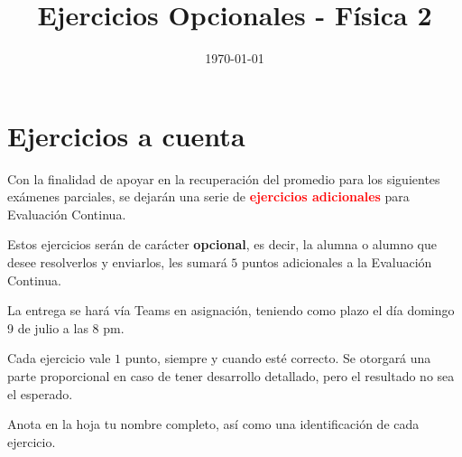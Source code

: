 \documentclass[14pt]{extarticle}
\title{\vspace*{-2cm} Ejercicios Opcionales - Física 2\vspace{-5ex}}
\date{\today}
\newcommand{\textocolor}[2]{\textbf{\textcolor{#1}{#2}}}
\begin{document}
\maketitle

\section{Ejercicios a cuenta}

Con la finalidad de apoyar en la recuperación del promedio para los siguientes exámenes parciales, se dejarán una serie de \textocolor{red}{ejercicios adicionales} para Evaluación Continua.


Estos ejercicios serán de carácter \textocolor{cobalt}{opcional}, es decir, la alumna o alumno que desee resolverlos y enviarlos, les sumará $5$ puntos adicionales a la Evaluación Continua.

La entrega se hará vía Teams en asignación, teniendo como plazo el día domingo 9 de julio a las 8 pm.

Cada ejercicio vale $1$ punto, siempre y cuando esté correcto. Se otorgará una parte proporcional en caso de tener desarrollo detallado, pero el resultado no sea el esperado.

Anota en la hoja tu nombre completo, así como una identificación de cada ejercicio.
\end{document}
